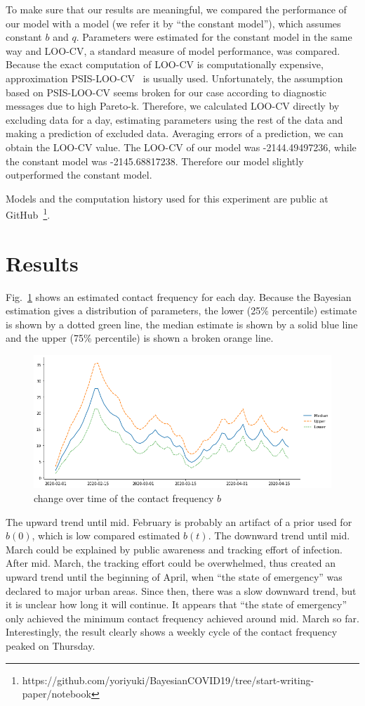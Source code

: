 \documentclass{amsart}
\begin{document}
To make sure that our results are meaningful, we compared the performance of our model with a model (we refer it by ``the constant model''), which assumes constant $b$ and $q$.
Parameters were estimated for the constant model in the same way and LOO-CV, a standard measure of model performance, was compared.
Because the exact computation of LOO-CV is computationally expensive, approximation PSIS-LOO-CV~\cite{Vehtari2017} is usually used.
Unfortunately, the assumption based on PSIS-LOO-CV seems broken for our case according to diagnostic messages due to high Pareto-k.
Therefore, we calculated LOO-CV directly by excluding data for a day, estimating parameters using the rest of the data and making a prediction of excluded data.
Averaging errors of a prediction, we can obtain the LOO-CV value.
The LOO-CV of our model was -2144.49497236, while the constant model was -2145.68817238. Therefore our model slightly outperformed the constant model.

Models and the computation history used for this experiment are public at GitHub~\footnote{https://github.com/yoriyuki/BayesianCOVID19/tree/start-writing-paper/notebook}.

\section{Results}

Fig.~\ref{fig:b} shows an estimated contact frequency for each day.
Because the Bayesian estimation gives a distribution of parameters, the lower (25\% percentile) estimate is shown by a dotted green line, the median estimate is shown by a solid blue line and the upper (75\% percentile) is shown a broken orange line.
\begin{figure}[h]
 \centering
 \includegraphics[width=\linewidth]{fig/b-Japan.png}
 \caption{ change over time of the contact frequency $b$}
 \label{fig:b}
\end{figure}
The upward trend until mid. February is probably an artifact of a prior used for $b(0)$, which is low compared estimated $b(t)$.
The downward trend until mid. March could be explained by public awareness and tracking effort of infection.
After mid. March, the tracking effort could be overwhelmed, thus created an upward trend until the beginning of April, when ``the state of emergency'' was declared to major urban areas.
Since then, there was a slow downward trend, but it is unclear how long it will continue.
It appears that ``the state of emergency'' only achieved the minimum contact frequency achieved around mid. March so far.
Interestingly, the result clearly shows a weekly cycle of the contact frequency peaked on Thursday.
\end{document}
